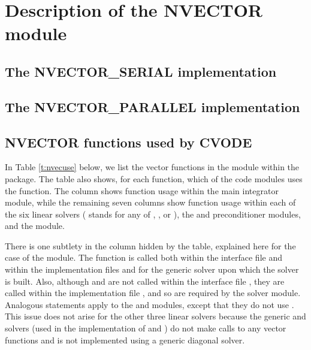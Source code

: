 \chapter{Description of the NVECTOR module}\label{s:nvector}


\section{The NVECTOR\_SERIAL implementation}\label{ss:nvec_ser}


\section{The NVECTOR\_PARALLEL implementation}\label{ss:nvec_par}


\section{NVECTOR functions used by CVODE}

In Table \ref{t:nvecuse} below, we list the vector functions in the 
{\nvector} module within the {\cvode} package.
The table also shows, for each function, which of the code modules uses
the function. The {\cvode} column shows function usage within the main
integrator module, while the remaining seven columns show function usage
within each of the six {\cvode} linear solvers ({\cvspils} stands for any
of {\cvspgmr}, {\cvspbcg}, or {\cvsptfqmr}), the {\cvbandpre} and
{\cvbbdpre} preconditioner modules, and the {\fcvode} module.

There is one subtlety in the {\cvspils} column hidden by the table, explained
here for the case of the {\cvspgmr} module. 
The  function is called both within the interface file
 and within the implementation
files  and  for the generic
{\spgmr} solver upon which the {\cvspgmr} solver is built.  Also, although
 and  are not called within the interface file
, they are called within the implementation file
, and so are required by the {\cvspgmr} solver module.
Analogous statements apply to the {\cvspbcg} and {\cvsptfqmr} modules,
except that they do not use .
This issue does not arise for the other 
three {\cvode} linear solvers because the generic {\dense} and {\band} solvers 
(used in the implementation of {\cvdense} and {\cvband}) do not make calls to 
any vector functions and {\cvdiag} is not implemented using a generic diagonal solver. 

